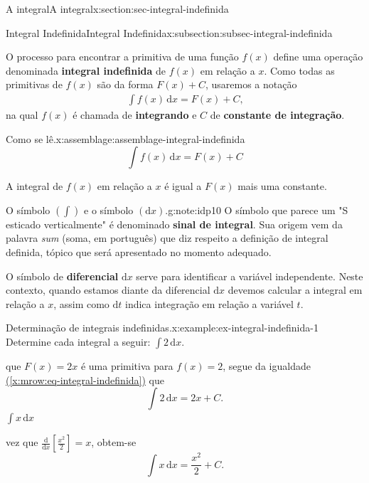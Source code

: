 \documentclass[oneside,10pt,]{article}
\newcommand{\xreffont}{\relax}
\newcommand{\terminology}[1]{\textbf{#1}}
\numberwithin{equation}{section}
\newcommand{\dd}{\mathrm{d}}
\newcommand{\integral}[2]{\displaystyle\int {#1}\,\dd {#2}}
\begin{document}
\begin{sectionptx}{A integral}{}{A integral}{}{}{x:section:sec-integral-indefinida}
\begin{subsectionptx}{Integral Indefinida}{}{Integral Indefinida}{}{}{x:subsection:subsec-integral-indefinida}
\par
O processo para encontrar a primitiva de uma função \(f(x)\) define uma operação denominada \terminology{integral indefinida}  de \(f(x)\) em relação a \(x\). Como todas as primitivas de \(f(x)\) são da forma \(F(x) + C\), usaremos a notação%
\begin{gather}
\integral{f(x)}{x}=F(x) + C \text{,}\label{x:mrow:eq-integral-indefinida}
\end{gather}
na qual \(f(x)\) é chamada de \terminology{integrando}  e \(C\)  de \terminology{constante de integração}.%
\begin{assemblage}{Como se lê.}{x:assemblage:assemblage-integral-indefinida}%
%
\begin{equation*}
\integral{f(x)}{x}=F(x) + C
\end{equation*}
%
\par
A integral de \(f(x)\) em relação a \(x\) é igual a \(F(x)\) mais uma constante.%
\end{assemblage}
\begin{note}{O símbolo \((\displaystyle\int)\) e o símbolo \((\dd x)\).}{g:note:idp10}%
O símbolo que parece um "S esticado verticalmente" é denominado \terminology{sinal de integral}. Sua origem vem da palavra \emph{sum} (soma, em português) que diz respeito a definição de integral definida, tópico que será apresentado no momento adequado.%
\par
O símbolo de \terminology{diferencial} \(\dd x\) serve para identificar a variável independente. Neste contexto, quando estamos diante da diferencial \(\dd x\) devemos calcular a integral em relação a \(x\), assim como \(\dd t\) indica integração em relação a variável \(t\).%
\end{note}
\begin{example}{Determinação de integrais indefinidas.}{x:example:ex-integral-indefinida-1}%
Determine cada integral a seguir: \(\integral{2}{x}.\)%
\par\smallskip%
 que \(F(x)=2x\) é uma primitiva para \(f(x)=2\), segue da igualdade \hyperref[x:mrow:eq-integral-indefinida]{({\xreffont\ref{x:mrow:eq-integral-indefinida}})} que%
\begin{equation*}
\integral{2}{x}=2x + C\text{.}
\end{equation*}
%
 \(\integral{x}{x}\)%
\par\smallskip%
\noindentUma vez que \(\frac{\dd}{\dd x}[\frac{x^2}{2}]=x\), obtem-se%
\begin{equation*}
\integral{x}{x}=\frac{x^2}{2} + C\text{.}

\end{equation*}
\end{example}
\end{subsectionptx}
\end{sectionptx}
\end{document}
